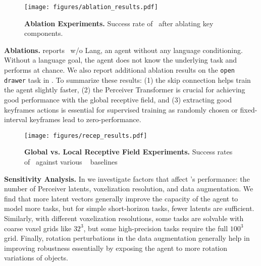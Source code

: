 \begin{wrapfigure}{r}{0.4\textwidth}
  
  \begin{center}
    \vspace{-0.8cm}
    \texttt{[image: figures/ablation\_results.pdf]}

  \vspace{-0.05cm}
  \caption{\textbf{Ablation Experiments.} Success rate of \model~after ablating key components.}
  \label{fig:ablations}
  \end{center}
  \vspace{-1em}
\end{wrapfigure}
\vspace{-0.05cm}
\textbf{Ablations.}  reports \model~w/o Lang, an agent without any language conditioning. Without a language goal, the agent does not know the underlying task and performs at chance. We also report additional ablation results on the \texttt{open drawer} task in . To summarize these results: (1) the skip connection helps train the agent slightly faster, (2) the Perceiver Transformer is crucial for achieving good performance with the global receptive field, and (3) extracting good keyframes actions is essential for supervised training as randomly chosen or fixed-interval keyframes lead to zero-performance.

\begin{wrapfigure}{r}{0.4\textwidth}
    \vspace{-1.63cm}
  \begin{center}
    \texttt{[image: figures/recep\_results.pdf]}
  \end{center}
  \vspace{-1.2em}
  \caption{\textbf{Global vs. Local Receptive Field Experiments.} Success rates of \model~against various \unet~\citep{c2farm} baselines}
  \label{fig:recep_results}
  \vspace{-0.5cm}
\end{wrapfigure}
\textbf{Sensitivity Analysis.} In  we investigate factors that affect \model's performance: the number of Perceiver latents, voxelization resolution, and data augmentation. We find that more latent vectors generally improve the capacity of the agent to model more tasks, but for simple short-horizon tasks, fewer latents are sufficient. Similarly, with different voxelization resolutions, some tasks are solvable with coarse voxel grids like $32^3$, but some high-precision tasks require the full $100^3$ grid. Finally, rotation perturbations in the data augmentation generally help in improving robustness essentially by exposing the agent to more rotation variations of objects.

